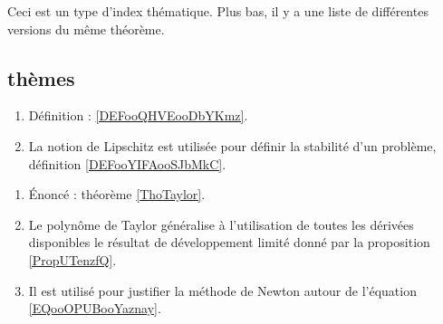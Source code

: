 
Ceci est un type d'index thématique. Plus bas, il y a une liste de différentes versions du même théorème.

\subsection*{thèmes}

    \begin{enumerate}
    \item
        Définition : \ref{DEFooQHVEooDbYKmz}.
    \item
        La notion de Lipschitz est utilisée pour définir la stabilité d'un problème, définition \ref{DEFooYIFAooSJbMkC}.
    \end{enumerate}

    \begin{enumerate}
    \item
        Énoncé : théorème \ref{ThoTaylor}.
        \item
            Le polynôme de Taylor généralise à l'utilisation de toutes les dérivées disponibles le résultat de développement limité donné par la proposition \ref{PropUTenzfQ}.
        \item
            Il est utilisé pour justifier la méthode de Newton autour de l'équation \eqref{EQooOPUBooYaznay}.
        \end{enumerate}

